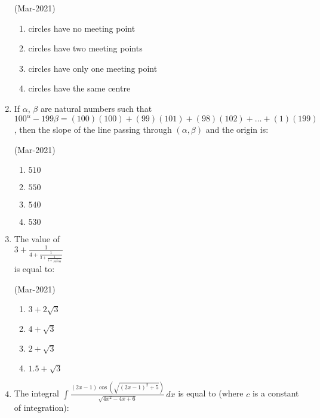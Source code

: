 \documentclass[journal,12pt,onecolumn]{IEEEtran}
\theoremstyle{remark}
\begin{document}
\begin{enumerate}
	\hfill{(Mar-2021)}
	\begin{multicols}{2}
                \begin{enumerate}
    \item circles have no meeting point
    \item circles have two meeting points
    \item circles have only one meeting point
    \item circles have the same centre
                \end{enumerate}
	\end{multicols}
	\item
                If $\alpha$, $\beta$ are natural numbers such that $100^{\alpha} - 199\beta = (100)(100) + (99)(101) + (98)(102) + \ldots + (1)(199)$, then the slope of the line passing through $(\alpha ,\beta)$ and the origin is:

			\hfill{(Mar-2021)}
			\begin{multicols}{4}
                \begin{enumerate}
    \item $ 510 $
    \item $ 550 $
    \item $ 540 $
    \item $ 530 $
                \end{enumerate}
			\end{multicols}
	\item
		The value of \\
		$ 3 + \frac{1}{4 + \frac{1}{3 + \frac{1}{4 + \frac{1}{3 + \ldots \infty}}}} $  \\
		is equal to:

			\hfill{(Mar-2021)}
			\begin{multicols}{2}
		\begin{enumerate}
    \item $ 3 + 2\sqrt{3} $
    \item $ 4 + \sqrt{3} $
    \item $ 2 + \sqrt{3} $
    \item $ 1.5 + \sqrt{3} $
                \end{enumerate}
			\end{multicols}
	\item
		The integral $
\int \frac{(2x - 1) \cos\left(\sqrt{(2x - 1)^2 + 5}\right)}{\sqrt{4x^2 - 4x + 6}} \, dx $ is equal to (where \( c \) is a constant of integration):


\end{enumerate}
\end{document}
